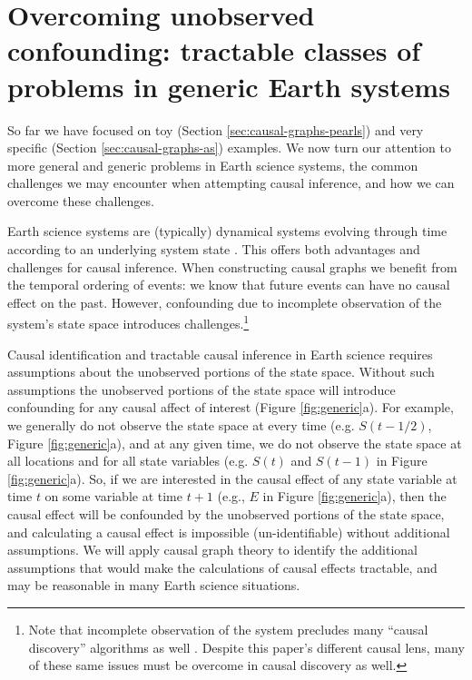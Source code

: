 \documentclass[12pt]{article}
\begin{document}
\section{Overcoming unobserved confounding: tractable classes of
  problems in generic Earth systems}
\label{sec:necess-cond-caus}

So far we have focused on toy (Section \ref{sec:causal-graphs-pearls})
and very specific (Section \ref{sec:causal-graphs-as}) examples. We
now turn our attention to more general and generic problems in Earth
science systems, the common challenges we may encounter when
attempting causal inference, and how we can overcome these challenges.

Earth science systems are (typically) dynamical systems evolving
through time according to an underlying system state
\citep{lorenz-1963,lorenz1996predictability,majda-state}. This offers
both advantages and challenges for causal inference. When constructing
causal graphs we benefit from the temporal ordering of events: we know
that future events can have no causal effect on the past. However,
confounding due to incomplete observation of the system's state space
introduces challenges.\footnote{Note that incomplete observation of
  the system precludes many ``causal discovery'' algorithms as well
  \citep[see ][ for a great review]{runge2019inferring}. Despite this
  paper's different causal lens, many of these same issues must be
  overcome in causal discovery as well.}

Causal identification and tractable causal inference in Earth science
requires assumptions about the unobserved portions of the state
space. Without such assumptions the unobserved portions of the state
space will introduce confounding for any causal affect of interest
(Figure \ref{fig:generic}a). For example, we generally do not observe
the state space at every time (e.g. $S(t-1/2)$, Figure
\ref{fig:generic}a), and at any given time, we do not observe the
state space at all locations and for all state variables (e.g. $S(t)$
and $S(t-1)$ in Figure \ref{fig:generic}a). So, if we are interested
in the causal effect of any state variable at time $t$ on some
variable at time $t+1$ (e.g., $E$ in Figure \ref{fig:generic}a), then
the causal effect will be confounded by the unobserved portions of the
state space, and calculating a causal effect is impossible
(un-identifiable) without additional assumptions. We will apply causal
graph theory to identify the additional assumptions that would make
the calculations of causal effects tractable, and may be reasonable in
many Earth science situations.
\end{document}
